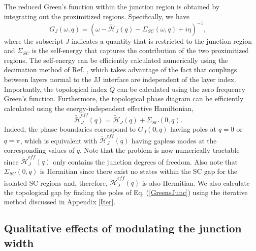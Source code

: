 \documentclass[twocolumn,aps,prb,nofootinbib]{revtex4-2}
\begin{document}
The reduced Green's function within the junction region is obtained by integrating out the proximitized regions. Specifically, we have
\begin{equation}
    G_J(\omega,q) = 
    \left(\omega - \widetilde{\mathcal{H}}_J(q)
    - \Sigma_{SC}(\omega,q)
    + i \eta\right)^{-1}, \label{GreensJunc}
\end{equation}
where the subscript $J$ indicates a quantity that is restricted to the junction region and $\Sigma_{SC}$ is the self-energy that captures the contribution of the two proximitized regions. The self-energy can be efficiently calculated numerically using the decimation method of Ref. \cite{Sancho1985}, which takes advantage of the fact that couplings between layers normal to the JJ interface are independent of the layer index.
Importantly, the topological index $Q$ can be calculated using the zero frequency  Green's function. Furthermore, the topological phase diagram can be efficiently calculated using the energy-independent effective Hamiltonian,
\begin{equation}
    \widetilde{\mathcal{H}}_{J}^{eff}(q) = 
    \widetilde{\mathcal{H}}_J(q)
    + \Sigma_{SC}(0,q).
\end{equation}
Indeed, the phase boundaries correspond to $G_J(0,q)$ having poles at $q=0$ or $q=\pi$, which is equivalent with $\widetilde{\mathcal{H}}_{J}^{eff}(q)$ having gapless modes at the corresponding values of $q$. Note that the problem is now numerically tractable since $\widetilde{\mathcal{H}}_{J}^{eff}(q)$ only contains the junction degrees of freedom. Also note that $\Sigma_{SC}(0,q)$ is Hermitian since there exist no states within the SC gap for the isolated SC regions and, therefore, $\widetilde{\mathcal{H}}_{J}^{eff}(q)$ is also Hermitian. We also calculate the topological gap by finding the poles of Eq. (\ref{GreensJunc}) using the iterative method discussed in Appendix \ref{Iter}. 


\subsection{Qualitative effects of modulating the junction width} \label{QEM}
\end{document}
